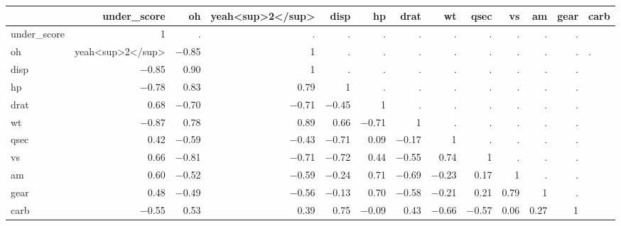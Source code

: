 \begin{table}
\centering
\begin{tabular}[t]{lrrrrrrrrrrr}
\toprule
  & under_score & oh&yeah<sup>2</sup> & disp & hp & drat & wt & qsec & vs & am & gear & carb\\
\midrule
under_score & 1 & . & . & . & . & . & . & . & . & . & .\\
oh&yeah<sup>2</sup> & \num{-.85} & 1 & . & . & . & . & . & . & . & . & .\\
disp & \num{-.85} & \num{.90} & 1 & . & . & . & . & . & . & . & .\\
hp & \num{-.78} & \num{.83} & \num{.79} & 1 & . & . & . & . & . & . & .\\
drat & \num{.68} & \num{-.70} & \num{-.71} & \num{-.45} & 1 & . & . & . & . & . & .\\
wt & \num{-.87} & \num{.78} & \num{.89} & \num{.66} & \num{-.71} & 1 & . & . & . & . & .\\
qsec & \num{.42} & \num{-.59} & \num{-.43} & \num{-.71} & \num{.09} & \num{-.17} & 1 & . & . & . & .\\
vs & \num{.66} & \num{-.81} & \num{-.71} & \num{-.72} & \num{.44} & \num{-.55} & \num{.74} & 1 & . & . & .\\
am & \num{.60} & \num{-.52} & \num{-.59} & \num{-.24} & \num{.71} & \num{-.69} & \num{-.23} & \num{.17} & 1 & . & .\\
gear & \num{.48} & \num{-.49} & \num{-.56} & \num{-.13} & \num{.70} & \num{-.58} & \num{-.21} & \num{.21} & \num{.79} & 1 & .\\
carb & \num{-.55} & \num{.53} & \num{.39} & \num{.75} & \num{-.09} & \num{.43} & \num{-.66} & \num{-.57} & \num{.06} & \num{.27} & 1\\
\bottomrule
\end{tabular}
\end{table}
